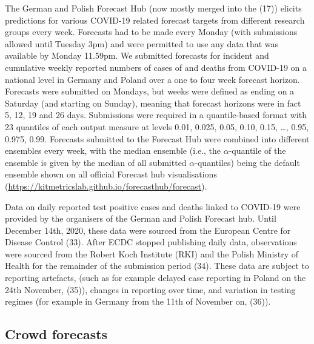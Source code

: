 \documentclass[
]{article}
\begin{document}
The German and Polish Forecast Hub (now mostly merged into the (17)) elicits predictions for various COVID-19 related forecast targets from different research groups every week. Forecasts had to be made every Monday (with submissions allowed until Tuesday 3pm) and were permitted to use any data that was available by Monday 11.59pm. We submitted forecasts for incident and cumulative weekly reported numbers of cases of and deaths from COVID-19 on a national level in Germany and Poland over a one to four week forecast horizon. Forecasts were submitted on Mondays, but weeks were defined as ending on a Saturday (and starting on Sunday), meaning that forecast horizons were in fact 5, 12, 19 and 26 days. Submissions were required in a quantile-based format with 23 quantiles of each output measure at levels 0.01, 0.025, 0.05, 0.10, 0.15, \ldots, 0.95, 0.975, 0.99. Forecasts submitted to the Forecast Hub were combined into different ensembles every week, with the median ensemble (i.e., the \(\alpha\)-quantile of the ensemble is given by the median of all submitted \(\alpha\)-quantiles) being the default ensemble shown on all official Forecast hub visualisations (\url{https://kitmetricslab.github.io/forecasthub/forecast}).

Data on daily reported test positive cases and deaths linked to COVID-19 were provided by the organisers of the German and Polish Forecast hub. Until December 14th, 2020, these data were sourced from the European Centre for Disease Control (33). After ECDC stopped publishing daily data, observations were sourced from the Robert Koch Institute (RKI) and the Polish Ministry of Health for the remainder of the submission period (34). These data are subject to reporting artefacts, (such as for example delayed case reporting in Poland on the 24th November, (35)), changes in reporting over time, and variation in testing regimes (for example in Germany from the 11th of November on, (36)).

\hypertarget{crowd-forecasts}{%
\subsection{Crowd forecasts}\label{crowd-forecasts}}
\end{document}
